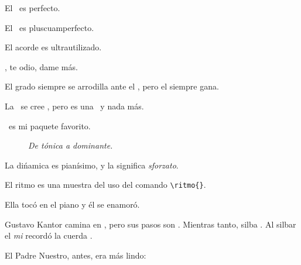 \documentclass[a4paper]{article}
\begin{document}
\renewcommand\figurename{Ejemplo}

El \becuadrotxt\ es perfecto.

El \becuadro\ es pluscuamperfecto.

El acorde  es ultrautilizado.

, te odio, dame más.

El  grado siempre se arrodilla ante el , pero el  siempre gana.

La \negra\ se cree \blancab, pero es una \redonda\ y nada más.

\noindent \musLuaTeX\ es mi paquete favorito.
\begin{figure}[H]
\begin{center}
\end{center}
\caption{\emph{De tónica a dominante.}}
\end{figure}

La dińamica  es pianísimo, y la  significa \emph{sforzato}.

El ritmo  es una muestra del uso del comando \texttt{\textbackslash ritmo\{\}}.

Ella tocó en el piano  y él se enamoró.

Gustavo Kantor camina en , pero sus pasos son . Mientras tanto, silba . Al silbar el \emph{mi} recordó la cuerda .

El Padre Nuestro, antes, era más lindo:


\end{document}
